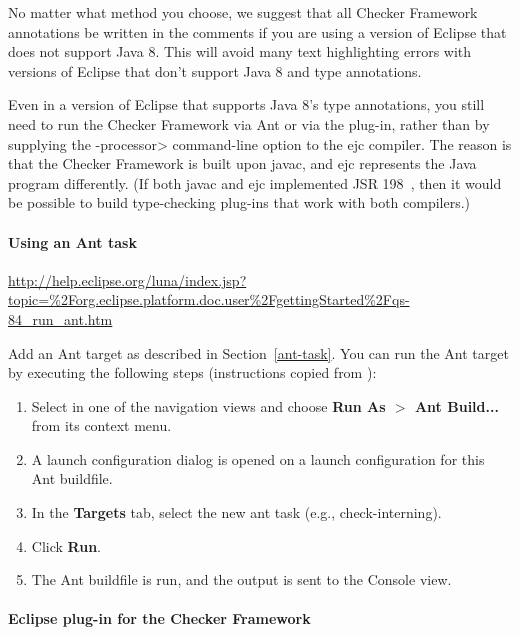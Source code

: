 No matter what method you choose, we suggest that
all Checker Framework annotations be written in the comments
if you are using a version of Eclipse that
does not support Java 8.  This will avoid many
text highlighting errors with versions of Eclipse that don't support Java 8
and type annotations.

Even in a version of Eclipse that supports Java 8's type annotations, you
still need to run the Checker Framework via Ant or via the plug-in, rather
than by supplying the \<-processor> command-line option to the ejc
compiler.  The reason is that the Checker Framework is built upon javac,
and ejc represents the Java program differently.  (If both javac and ejc
implemented JSR 198~\cite{JSR198}, then it would be possible to build
type-checking plug-ins that work with both compilers.)


\paragraph{Using an Ant task}

\urldef{\eclipseRunningAnt}\url{http://help.eclipse.org/luna/index.jsp?topic=%2Forg.eclipse.platform.doc.user%2FgettingStarted%2Fqs-84_run_ant.htm}

Add an Ant target as described in Section~\ref{ant-task}.  You can
run the Ant target by executing the following steps
(instructions copied from {\codesize\eclipseRunningAnt}):

\begin{enumerate}

\item
  Select  in one of the navigation views and choose
  {\bf Run As $>$ Ant Build...} from its context menu.

\item
  A launch configuration dialog is opened on a launch configuration
  for this Ant buildfile.

\item
  In the {\bf Targets} tab, select the new ant task (e.g., check-interning).

\item
  Click {\bf Run}.

\item
  The Ant buildfile is run, and the output is sent to the Console view.

\end{enumerate}

\paragraph{Eclipse plug-in for the Checker Framework}

